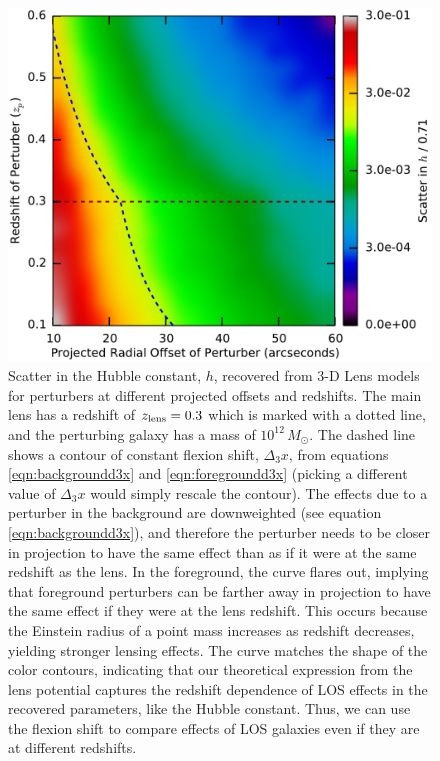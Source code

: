 \documentclass{emulateapj}
\begin{document}
\begin{figure}[t]
\begin{center}
\includegraphics[width=\columnwidth]{toyh.pdf}
\caption{\label{fig:toyhd3x} Scatter in the Hubble constant, $h$, recovered from 3-D Lens models for perturbers at different projected offsets and redshifts.  The main lens has a redshift of $z_{\rm{lens}} = 0.3$ which is marked with a dotted line, and the perturbing galaxy has a mass of $10^{12}\,M_\odot$.  The dashed line shows a contour of constant flexion shift, $\Delta_3 x$, from equations \ref{eqn:backgroundd3x} and \ref{eqn:foregroundd3x} (picking a different value of $\Delta_3 x$ would simply rescale the contour). The effects due to a perturber in the background are downweighted (see equation \ref{eqn:backgroundd3x}), and therefore the perturber needs to be closer in projection to have the same effect than as if it were at the same redshift as the lens. In the foreground, the curve flares out, implying that foreground perturbers can be farther away in projection to have the same effect if they were at the lens redshift. This occurs because the Einstein radius of a point mass increases as redshift decreases, yielding stronger lensing effects. The curve matches the shape of the color contours, indicating that our theoretical expression from the lens potential captures the redshift dependence of LOS effects in the recovered parameters, like the Hubble constant.  Thus, we can use the flexion shift to compare effects of LOS galaxies even if they are at different redshifts.
}
\end{center}
\end{figure}
\end{document}
